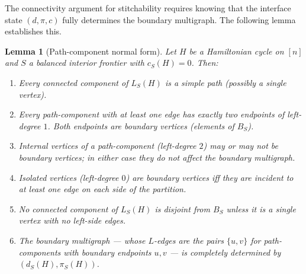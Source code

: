 \documentclass[11pt]{article}
\newtheorem{lemma}[theorem]{Lemma}
\begin{document}
The connectivity argument for stitchability requires
knowing that the interface state $(d, \pi, c)$ fully
determines the boundary multigraph.  The following lemma
establishes this.

\begin{lemma}[Path-component normal form]
\label{lem:normal-form}
Let $H$ be a Hamiltonian cycle on $[n]$ and $S$ a
balanced interior frontier with $c_S(H) = 0$.  Then:
\begin{enumerate}
\item Every connected component of $L_S(H)$ is a simple
  path (possibly a single vertex).
\item Every path-component with at least one edge has
  exactly two endpoints of left-degree $1$.
  Both endpoints are boundary vertices (elements of
  $B_S$).
\item Internal vertices of a path-component (left-degree
  $2$) may or may not be boundary vertices; in either
  case they do not affect the boundary multigraph.
\item Isolated vertices (left-degree $0$) are boundary
  vertices iff they are incident to at least one edge
  on each side of the partition.
\item No connected component of $L_S(H)$ is disjoint
  from $B_S$ unless it is a single vertex with no
  left-side edges.
\item The boundary multigraph --- whose $L$-edges are the
  pairs $\{u,v\}$ for path-components with boundary
  endpoints $u, v$ --- is completely determined by
  $(d_S(H), \pi_S(H))$.
\end{enumerate}
\end{lemma}
\end{document}
